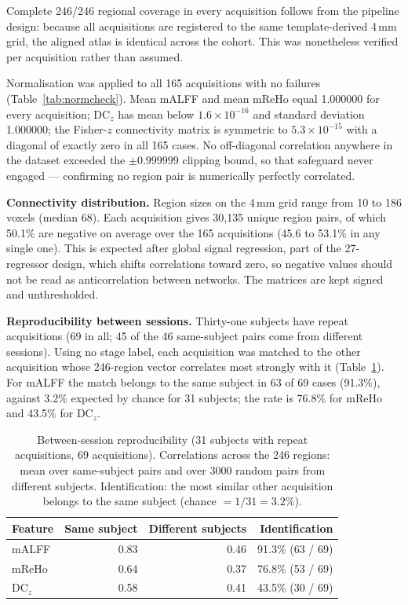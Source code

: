\documentclass{ssnreview}
\begin{document}
Complete 246/246 regional coverage in every acquisition follows from the pipeline
design: because all acquisitions are registered to the same template-derived 4\,mm
grid, the aligned atlas is identical across the cohort. This was nonetheless
verified per acquisition rather than assumed.

Normalisation was applied to all 165 acquisitions with no failures
(Table~\ref{tab:normcheck}). Mean mALFF and
mean mReHo equal 1.000000 for every acquisition; DC$_z$ has mean below
$1.6\times10^{-16}$ and standard deviation 1.000000; the Fisher-$z$ connectivity
matrix is symmetric to $5.3\times10^{-15}$ with a diagonal of exactly zero in all
165 cases. No off-diagonal correlation anywhere in the dataset exceeded the
$\pm0.999999$ clipping bound, so that safeguard never engaged --- confirming no
region pair is numerically perfectly correlated.

\textbf{Connectivity distribution.} Region sizes on the 4\,mm grid range from 10 to 186 voxels
(median 68). Each acquisition gives 30{,}135 unique region pairs, of which 50.1\% are negative on
average over the 165 acquisitions (45.6 to 53.1\% in any single one). This is expected after global
signal regression, part of the 27-regressor design, which shifts correlations toward zero, so
negative values should not be read as anticorrelation between networks. The matrices are kept
signed and unthresholded.

\textbf{Reproducibility between sessions.} Thirty-one subjects have repeat acquisitions (69 in all;
45 of the 46 same-subject pairs come from different sessions). Using no stage label, each
acquisition was matched to the other acquisition whose 246-region vector correlates most strongly
with it (Table~\ref{tab:session}). For mALFF the match belongs to the same subject in 63 of 69 cases
(91.3\%), against 3.2\% expected by chance for 31 subjects; the rate is 76.8\% for mReHo and 43.5\%
for DC$_z$.

\begin{table}[!htbp]
\centering
\caption[Between-session reproducibility of the regional features]{Between-session reproducibility (31 subjects with repeat acquisitions, 69 acquisitions).
Correlations across the 246 regions: mean over same-subject pairs and over 3000 random pairs from
different subjects. Identification: the most similar other acquisition belongs to the same subject
(chance $=1/31=3.2\%$).}
\label{tab:session}
\small
\begin{tabular}{@{}lrrr@{}}
\toprule
\textbf{Feature} & \textbf{Same subject} & \textbf{Different subjects} & \textbf{Identification} \\
\midrule
mALFF & 0.83 & 0.46 & 91.3\% (63 / 69) \\
mReHo & 0.64 & 0.37 & 76.8\% (53 / 69) \\
DC$_z$ & 0.58 & 0.41 & 43.5\% (30 / 69) \\
\bottomrule
\end{tabular}
\end{table}
\end{document}
